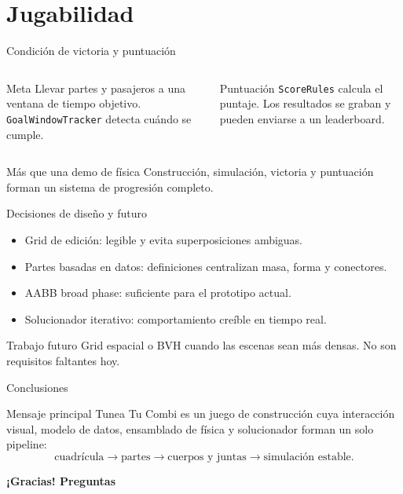 \documentclass[aspectratio=169,11pt]{beamer}
\begin{document}
\section{Jugabilidad}

\begin{frame}{Condición de victoria y puntuación}
  \begin{columns}[T]
    \begin{block}{Meta}
      Llevar partes y pasajeros a una ventana de tiempo objetivo.
      \texttt{GoalWindowTracker} detecta cuándo se cumple.
    \end{block}
    \begin{block}{Puntuación}
      \texttt{ScoreRules} calcula el puntaje. Los resultados se graban y
      pueden enviarse a un leaderboard.
    \end{block}
  \end{columns}

  \vspace{0.1cm}
  \begin{alertblock}{Más que una demo de física}
    Construcción, simulación, victoria y puntuación forman un sistema de
    progresión completo.
  \end{alertblock}
\end{frame}

\begin{frame}{Decisiones de diseño y futuro}
  \begin{itemize}
    \item Grid de edición: legible y evita superposiciones ambiguas.
    \item Partes basadas en datos: definiciones centralizan masa, forma y
      conectores.
    \item AABB broad phase: suficiente para el prototipo actual.
    \item Solucionador iterativo: comportamiento creíble en tiempo real.
  \end{itemize}

  \vspace{0.2cm}
  \begin{alertblock}{Trabajo futuro}
    Grid espacial o BVH cuando las escenas sean más densas. No son
    requisitos faltantes hoy.
  \end{alertblock}
\end{frame}

\begin{frame}{Conclusiones}
  \begin{block}{Mensaje principal}
    Tunea Tu Combi es un juego de construcción cuya interacción visual,
    modelo de datos, ensamblado de física y solucionador forman un solo
    pipeline:
    \[
      \text{cuadrícula} \rightarrow \text{partes} \rightarrow
      \text{cuerpos y juntas} \rightarrow \text{simulación estable}.
    \]
  \end{block}

  \vspace{0.25cm}
  \begin{center}
    \Large\textbf{¡Gracias! Preguntas}
  \end{center}
\end{frame}
\end{document}
